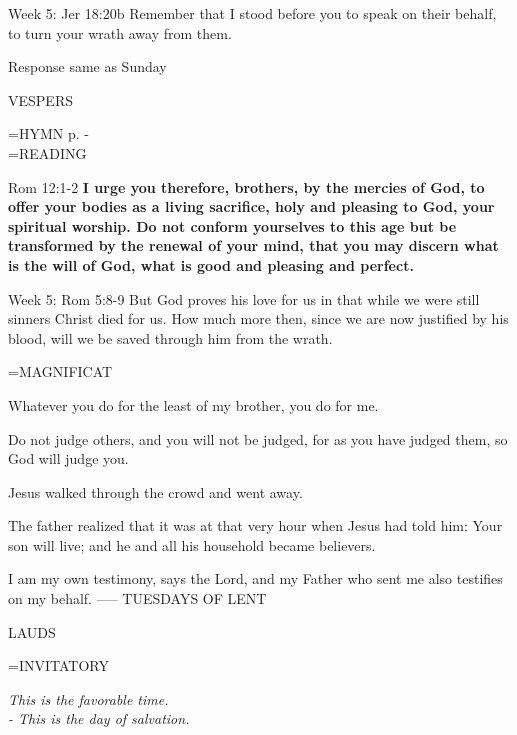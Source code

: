Week 5:    Jer 18:20b    Remember that I stood before you to speak on their behalf, to turn your wrath away from them.

Response same as Sunday

\begin{flushleft}\normalsize VESPERS\\\end{flushleft}
\hangindent=\parindent \small{\uppercase{HYMN} p. \pageref{lent:firstHymn}-\pageref{lent:lastHymn}\\}
\hangindent=\parindent \small READING
\begin{description}[labelindent=\parindent, leftmargin=*]
\item [Weeks 1-4:]      Rom 12:1-2 \textbf{     I urge you therefore, brothers, by the mercies of God, to offer your bodies as a living sacrifice, holy and pleasing to God, your spiritual worship. Do not conform yourselves to this age but be transformed by the renewal of your mind, that you may discern what is the will of God, what is good and pleasing and perfect.\\}
\end{description}

Week 5:     Rom 5:8-9     But God proves his love for us in that while we were still sinners Christ died for us. How much more then, since we are now justified by his blood, will we be saved through him from the wrath.

\hangindent=\parindent \small MAGNIFICAT
\begin{description}[labelindent=\parindent, leftmargin=*]
\item [Week 1:] 	Whatever you do for the least of my brother, you do for me.
\item [Week 2:] 	Do not judge others, and you will not be judged, for as you have judged them, so God will judge you.
\item [Week 3:] 	Jesus walked through the crowd and went away.
\item [Week 4:] 	The father realized that it was at that very hour when Jesus had told him: Your son will live; and he and all his household became believers.
\item [Week 5:] 	I am my own testimony, says the Lord, and my Father who sent me also testifies on my behalf.
-----
TUESDAYS OF LENT
\end{description}

\begin{flushleft}\normalsize LAUDS\\\end{flushleft}
\hangindent=\parindent \small{INVITATORY}
\begin{center}
\textit{This is the favorable time.\\}
\textit{- This is the day of salvation.\\}
\end{center}


